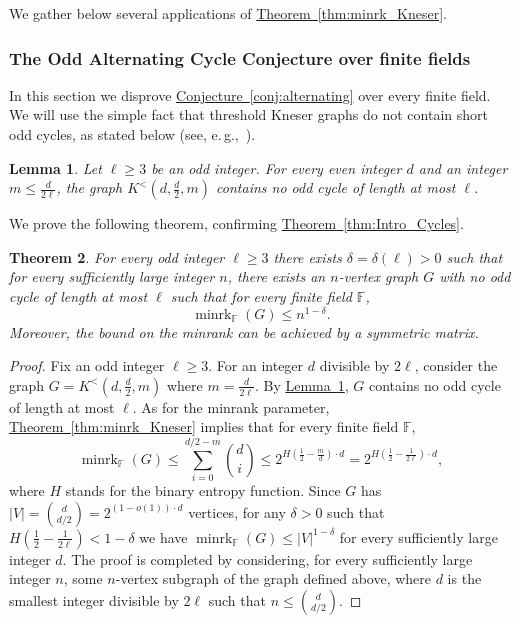 \documentclass[11pt]{article}
\numberwithin{equation}{section}
\newtheorem{theorem}{Theorem}[section]
\newtheorem{lemma}[theorem]{Lemma}
\theoremstyle{definition}
\theoremstyle{plain}
\newcommand{\expref}[2]{\hyperref[#2]{#1~\ref{#2}}}
\newcommand{\Fset}{\mathbb{F}}
\newcommand{\minrank}{\mathop{\mathrm{minrk}}}
\newcommand\Kneser[3]{K^<(#1,#2,#3)}
\begin{document}
We gather below several applications of \expref{Theorem}{thm:minrk_Kneser}.

\subsubsection{The Odd Alternating Cycle Conjecture over finite fields}

%
In this section we disprove %
\expref{Conjecture}{conj:alternating} over every finite field.
We will use the simple fact that
%
threshold Kneser graphs   %
do not contain short odd cycles, as stated below (see, e.\,g.,~\cite{Denley97,Haviv18free}).

\begin{lemma}\label{lemma:cycle_K}
Let $\ell \geq 3$ be an odd integer.
For every even integer $d$ and an integer $m \leq \frac{d}{2\ell}$, the graph $\Kneser{d}{\frac{d}{2}}{m}$ contains no odd cycle of length at most $\ell$.
\end{lemma}

We prove the following theorem, confirming \expref{Theorem}{thm:Intro_Cycles}.


\begin{theorem}\label{thm:Cycles}
For every odd integer $\ell \geq 3$ there exists $\delta = \delta(\ell) >0$ such that for every sufficiently large integer $n$, there exists an $n$-vertex graph $G$ with no odd cycle of length at most $\ell$ such that for every finite field $\Fset$,
\[{\minrank}_{\Fset}(G) \leq n^{1-\delta}.\]
Moreover, the bound on the minrank can be achieved by a symmetric matrix.
\end{theorem}


\begin{proof}
Fix an odd integer $\ell \geq 3$.
For an integer $d$ divisible by $2 \ell$, consider the graph $G = \Kneser{d}{\frac{d}{2}}{m}$ where $m = \frac{d}{2 \ell}$.
By \expref{Lemma}{lemma:cycle_K}, $G$ contains no odd cycle of length at most $\ell$.
As for the minrank parameter, \expref{Theorem}{thm:minrk_Kneser} implies that for every finite field $\Fset$,
\[{\minrank}_{\Fset}(G) \leq \sum_{i=0}^{d/2-m}\binom{d}{i} \leq 2^{H(\frac{1}{2}-\frac{m}{d}) \cdot d} = 2^{H(\frac{1}{2}-\frac{1}{2\ell}) \cdot d},\]
where $H$ stands for the binary entropy function.
Since $G$ has $|V| = \binom{d}{d/2} = 2^{(1-o(1)) \cdot d}$ vertices, for any $\delta>0$ such that $H(\frac{1}{2}-\frac{1}{2\ell}) < 1-\delta$ we have ${\minrank}_{\Fset}(G) \leq |V|^{1-\delta}$ for every sufficiently large integer $d$.
The proof is completed by considering, for every sufficiently large integer $n$, some $n$-vertex subgraph of the graph defined above, where $d$ is the smallest integer divisible by $2\ell$ such that $n \leq \binom{d}{d/2}$.
\end{proof}
\end{document}
